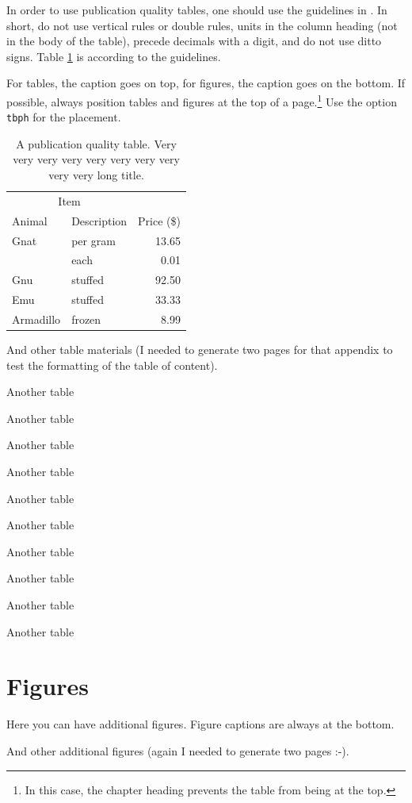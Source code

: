 \documentclass[msc,oneside]{ubcthesis}%
\begin{document}
In order to use publication quality tables, one should use the guidelines in \cite{Fear:2005manual}. In short, do not use vertical rules or double rules, units in the column heading (not in the body of the table), precede decimals with a digit, and do not use ditto signs. Table \ref{table:food} is according to the guidelines. 

For tables, the caption goes on top, for figures, the caption goes on the bottom. If possible, always position tables and figures at the top of a page.\footnote{In this case, the chapter heading prevents the table from being at the top.} Use the option \verb|tbph| for the placement.

\begin{table}[tbph]
\centering
\caption{A publication quality table. Very very very very very very very very very very long title.
\label{table:food}}
\begin{tabular}{@{}llr@{}} \toprule 
\multicolumn{2}{c}{Item} \\ \cmidrule(r){1-2} 
Animal & Description & Price (\$)\\ \midrule 
Gnat & per gram & 13.65 \\ 
& each & 0.01 \\ 
Gnu & stuffed & 92.50 \\ 
Emu & stuffed & 33.33 \\ 
Armadillo & frozen & 8.99 \\ \bottomrule 
\end{tabular}
\end{table}

\newpage
And other table materials (I needed to generate two pages for that appendix to test the formatting of the table of content).

\begin{table}
\caption{Another table}
\end{table}

\begin{table}
\caption{Another table}
\end{table}
\begin{table}
\caption{Another table}
\end{table}
\begin{table}
\caption{Another table}
\end{table}
\begin{table}
\caption{Another table}
\end{table}

\begin{table}
\caption{Another table}
\end{table}
\begin{table}
\caption{Another table}
\end{table}
\begin{table}
\caption{Another table}
\end{table}
\begin{table}
\caption{Another table}
\end{table}
\begin{table}
\caption{Another table}
\end{table}

\chapter{Figures}
Here you can have additional figures. Figure captions are always at the bottom.

\newpage

And other additional figures (again I needed to generate two pages :-).
\end{document}
